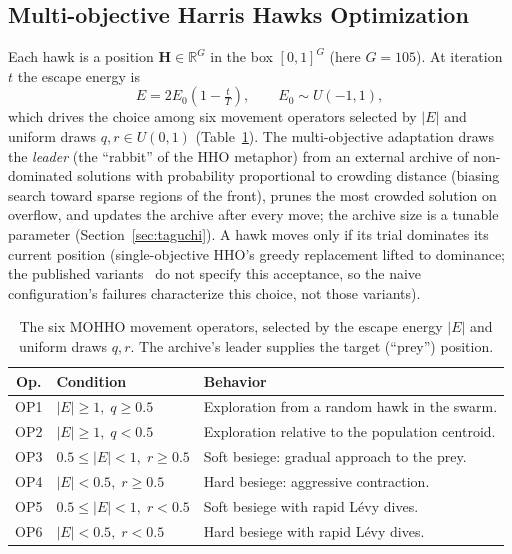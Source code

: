 \documentclass[runningheads]{llncs}
\begin{document}
\subsection{Multi-objective Harris Hawks Optimization}
\label{sec:mohho}

Each hawk is a position $\mathbf{H}\in\mathbb{R}^{G}$ in the box $[0,1]^{G}$ (here $G=105$). At iteration $t$ the escape energy is
\begin{equation}
E = 2E_0\!\left(1 - \tfrac{t}{T}\right), \qquad E_0 \sim U(-1,1),
\label{eq:energy}
\end{equation}
which drives the choice among six movement operators selected by $|E|$ and uniform draws $q,r\in U(0,1)$ (Table~\ref{tab:operators}). The multi-objective adaptation draws the \emph{leader} (the ``rabbit'' of the HHO metaphor) from an external archive of non-dominated solutions with probability proportional to crowding distance (biasing search toward sparse regions of the front), prunes the most crowded solution on overflow, and updates the archive after every move; the archive size is a tunable parameter (Section~\ref{sec:taguchi}). A hawk moves only if its trial dominates its current position (single-objective HHO's greedy replacement lifted to dominance; the published variants~\cite{jangir,cerci,kusoglu} do not specify this acceptance, so the naive configuration's failures characterize this choice, not those variants).

\begin{table}[t]
\centering
\caption{The six MOHHO movement operators, selected by the escape energy $|E|$ and uniform draws $q,r$. The archive's leader supplies the target (``prey'') position.}
\label{tab:operators}
\small
\begin{tabular}{cll}
\toprule
\textbf{Op.} & \textbf{Condition} & \textbf{Behavior}\\
\midrule
OP1 & $|E|\ge 1,\; q\ge 0.5$ & Exploration from a random hawk in the swarm.\\
OP2 & $|E|\ge 1,\; q< 0.5$ & Exploration relative to the population centroid.\\
OP3 & $0.5\le|E|< 1,\; r\ge 0.5$ & Soft besiege: gradual approach to the prey.\\
OP4 & $|E|< 0.5,\; r\ge 0.5$ & Hard besiege: aggressive contraction.\\
OP5 & $0.5\le|E|< 1,\; r< 0.5$ & Soft besiege with rapid Lévy dives.\\
OP6 & $|E|< 0.5,\; r< 0.5$ & Hard besiege with rapid Lévy dives.\\
\bottomrule
\end{tabular}
\end{table}
\end{document}
